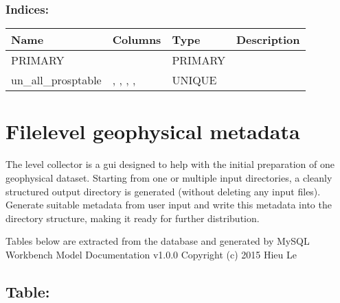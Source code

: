 \documentclass[letterpaper,10pt,english]{sphinxmanual}
\begin{document}
\subsubsection{Indices:}
\label{\detokenize{schema_documentation:id15}}

\begin{savenotes}\sphinxattablestart
\centering
\begin{tabulary}{\linewidth}[t]{|T|T|T|T|}
\hline
\sphinxstyletheadfamily 
Name
&\sphinxstyletheadfamily 
Columns
&\sphinxstyletheadfamily 
Type
&\sphinxstyletheadfamily 
Description
\\
\hline
PRIMARY
&
&
PRIMARY
&\\
\hline
un\_all\_prosptable
&
, , , , 
&
UNIQUE
&\\
\hline
\end{tabulary}
\par
\sphinxattableend\end{savenotes}


\section{File\sphinxhyphen{}level geophysical metadata}
\label{\detokenize{schema_documentation:file-level-geophysical-metadata}}
The  level collector is a gui designed to help with the initial preparation of one geophysical dataset. Starting from one or multiple input directories, a cleanly structured output directory is generated (without deleting any input files).
Generate suitable metadata from user input and write this metadata into the directory structure, making it ready for further distribution.


Tables below are extracted from the database and generated by MySQL Workbench Model Documentation v1.0.0 \sphinxhyphen{} Copyright (c)
2015 Hieu Le


\subsection{Table: }
\label{\detokenize{schema_documentation:table-report}}
\end{document}
